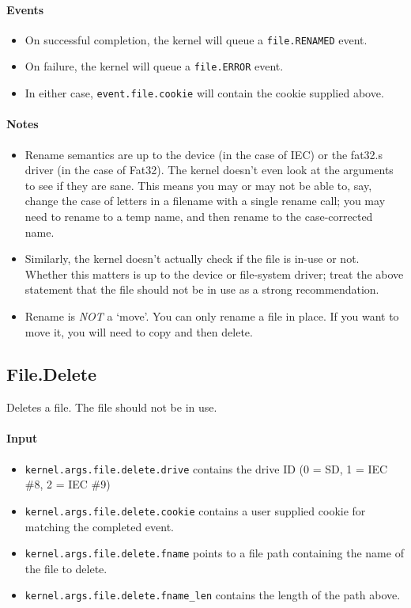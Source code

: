 \paragraph{Events}

\begin{itemize}
\item On successful completion, the kernel will queue a \verb+file.RENAMED+ event.
\item On failure, the kernel will queue a \verb+file.ERROR+ event.
\item In either case, \verb+event.file.cookie+ will contain the cookie supplied above.
\end{itemize}

\paragraph{Notes}

\begin{itemize}
\item Rename semantics are up to the device (in the case of IEC) or the fat32.s driver (in the case of Fat32).  The kernel doesn't even look at the arguments to see if they are sane.  This means you may or may not be able to, say, change the case of letters in a filename with a single rename call; you may need to rename to a temp name, and then rename to the case-corrected name.

\item Similarly, the kernel doesn't actually check if the file is in-use or not.  Whether this matters is up to the device or file-system driver; treat the above statement that the file should not be in use as a strong recommendation. 

\item Rename is {\em NOT} a `move'.  You can only rename a file in place.  If you want to move it, you will need to copy and then delete.
\end{itemize}

\subsection*{File.Delete}
Deletes a file.  The file should not be in use.

\paragraph{Input}

\begin{itemize}
\item \verb+kernel.args.file.delete.drive+ contains the drive ID (0 = SD, 1 = IEC \#8, 2 = IEC \#9)
\item \verb+kernel.args.file.delete.cookie+ contains a user supplied cookie for matching the completed event.
\item \verb+kernel.args.file.delete.fname+ points to a file path containing the name of the file to delete.
\item \verb+kernel.args.file.delete.fname_len+ contains the length of the path above.
\end{itemize}

